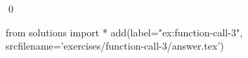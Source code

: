 \begin{ex}
  \label{ex:function-call-3}
  
  \qed
\end{ex}
\begin{python0}
from solutions import *
add(label="ex:function-call-3",
    srcfilename='exercises/function-call-3/answer.tex') 
\end{python0}                              
